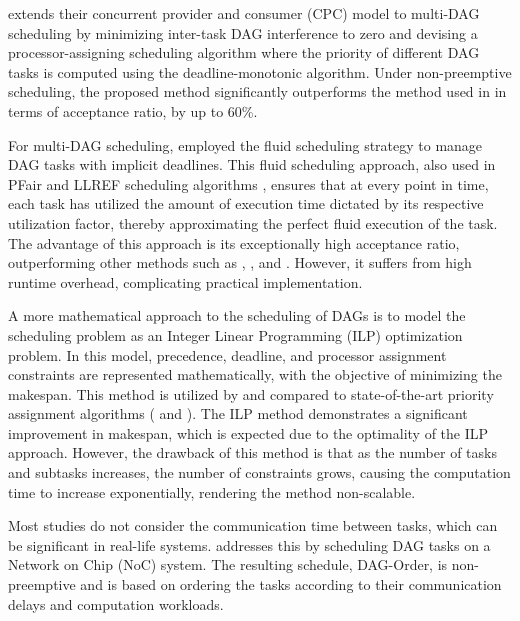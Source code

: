 \cite{zhao2022dag} extends their concurrent provider and consumer 
(CPC) model \cite{zhao2020dag} to multi-DAG scheduling by 
minimizing inter-task DAG interference to zero and devising a 
processor-assigning scheduling algorithm where the priority of 
different DAG tasks is computed using the deadline-monotonic 
algorithm. Under non-preemptive scheduling, the proposed method 
significantly outperforms the method used in \cite{he2019intra} in 
terms of acceptance ratio, by up to 60\%.

For multi-DAG scheduling, \cite{GuanDAGfluid2021} employed the 
fluid scheduling strategy to manage DAG tasks with implicit 
deadlines. This fluid scheduling approach, also used in PFair and 
LLREF scheduling algorithms \cite{baruah1993PFair}\cite{cho2006LLREF}, 
ensures that at every point in time, each task has utilized the 
amount of execution time dictated by its respective utilization 
factor, thereby approximating the perfect fluid execution of the 
task. The advantage of this approach is its exceptionally high 
acceptance ratio, outperforming other methods such as 
\cite{WangGEDFDag2019}, \cite{he2019intra}, and \cite{CaoStretchingDAGs2020}. 
However, it suffers from high runtime overhead, complicating 
practical implementation.
\newline

A more mathematical approach to the scheduling of DAGs is to model 
the scheduling problem as an Integer Linear Programming (ILP) 
optimization problem. In this model, precedence, deadline, and 
processor assignment constraints are represented mathematically, 
with the objective of minimizing the makespan. This method is 
utilized by \cite{ChangMinWRCTBoundILP2022} and compared to 
state-of-the-art priority assignment algorithms (\cite{he2019intra} 
and \cite{zhao2020dag}). The ILP method demonstrates a significant 
improvement in makespan, which is expected due to the optimality of 
the ILP approach. However, the drawback of this method is that as 
the number of tasks and subtasks increases, the number of 
constraints grows, causing the computation time to increase 
exponentially, rendering the method non-scalable.

Most studies do not consider the communication time between tasks, 
which can be significant in real-life systems. 
\cite{ChenDAGorder2023} addresses this by scheduling DAG tasks on a 
Network on Chip (NoC) system. The resulting schedule, DAG-Order, 
is non-preemptive and is based on ordering the tasks according to 
their communication delays and computation workloads.


